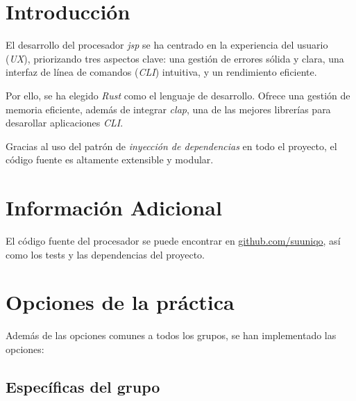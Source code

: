 \documentclass[a4paper]{CSMakotoTechnicalReport}
\begin{document}
\begin{multicols}{2} %


    \renewcommand{\contentsname}{Índice}
    \tableofcontents


    \section{Introducción}

    El desarrollo del procesador \textit{jsp} se ha centrado en la experiencia del usuario (\textit{UX}), priorizando tres aspectos clave: una gestión de errores sólida y clara, una interfaz de línea de comandos (\textit{CLI}) intuitiva, y un rendimiento eficiente.

    Por ello, se ha elegido \textit{Rust} como el lenguaje de desarrollo. Ofrece una gestión de memoria eficiente, además de integrar \textit{clap}, una de las mejores librerías para desarollar aplicaciones \textit{CLI}.

    Gracias al uso del patrón de \textit{inyección de dependencias} en todo el proyecto, el código fuente es altamente extensible y modular.

    \section{Información Adicional}

    El código fuente del procesador se puede encontrar en \href{https://www.github.com/suuniqo}{github.com/suuniqo}, así como los tests y las dependencias del proyecto.

    \section{Opciones de la práctica}

    Además de las opciones comunes a todos los grupos, se han implementado las opciones:

    \subsection{Específicas del grupo}


\end{multicols}
\end{document}
